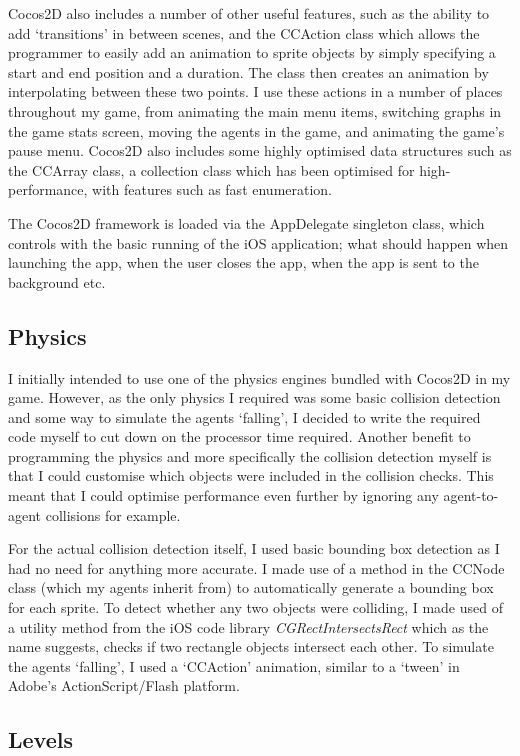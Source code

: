 \documentclass[a4paper,oneside]{report}
\begin{document}
Cocos2D also includes a number of other useful features, such as the ability to add `transitions' in between scenes, and the CCAction class which allows the programmer to easily add an animation to sprite objects by simply specifying a start and end position and a duration. The class then creates an animation by interpolating between these two points. I use these actions in a number of places throughout my game, from animating the main menu items, switching graphs in the game stats screen, moving the agents in the game, and animating the game's pause menu. Cocos2D also includes some highly optimised data structures such as the CCArray class, a collection class which has been optimised for high-performance, with features such as fast enumeration.

The Cocos2D framework is loaded via the AppDelegate singleton class, which controls with the basic running of the iOS application; what should happen when launching the app, when the user closes the app, when the app is sent to the background etc. 

\subsection{Physics}

I initially intended to use one of the physics engines bundled with Cocos2D in my game. However, as the only physics I required was some basic collision detection and some way to simulate the agents `falling', I decided to write the required code myself to cut down on the processor time required. Another benefit to programming the physics and more specifically the collision detection myself is that I could customise which objects were included in the collision checks. This meant that I could optimise performance even further by ignoring any agent-to-agent collisions for example.

For the actual collision detection itself, I used basic bounding box detection as I had no need for anything more accurate. I made use of a method in the CCNode class (which my agents inherit from) to automatically generate a bounding box for each sprite. To detect whether any two objects were colliding, I made used of a utility method from the iOS code library \emph{CGRectIntersectsRect} which as the name suggests, checks if two rectangle objects intersect each other. To simulate the agents `falling', I used a `CCAction' animation, similar to a `tween' in Adobe's ActionScript/Flash platform. 

\subsection{Levels} 
\end{document}
